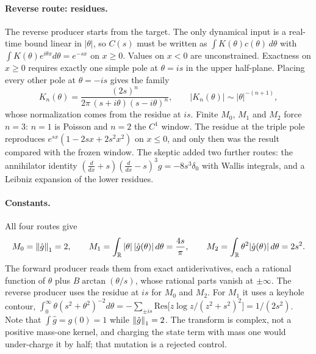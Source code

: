 \paragraph{Reverse route: residues.}
The reverse producer starts from the target. The only dynamical input is a
real-time bound linear in $|\theta|$, so $C(s)$ must be written as
$\int K(\theta)c(\theta)\,d\theta$ with $\int K(\theta)e^{i\theta x}d\theta=e^{-sx}$
on $x\ge0$. Values on $x<0$ are unconstrained. Exactness on $x\ge0$ requires
exactly one simple pole at $\theta=is$ in the upper half-plane. Placing every
other pole at $\theta=-is$ gives the family
\begin{equation}
 K_n(\theta)=\frac{(2s)^n}{2\pi\,(s+i\theta)(s-i\theta)^n},\qquad
 |K_n(\theta)|\sim|\theta|^{-(n+1)},
 \label{eq:av2-residue}
\end{equation}
whose normalization comes from the residue at $is$. Finite $M_0$, $M_1$ and
$M_2$ force $n=3$: $n=1$ is Poisson and $n=2$ the $C^1$ window. The residue at
the triple pole reproduces $e^{sx}(1-2sx+2s^2x^2)$ on $x\le0$, and only then
was the result compared with the frozen window. The skeptic added two further
routes: the annihilator identity
$(\tfrac{d}{dx}+s)(\tfrac{d}{dx}-s)^3g=-8s^3\delta_0$ with Wallis integrals,
and a Leibniz expansion of the lower residues.

\paragraph{Constants.}
All four routes give
\begin{equation}
 M_0=\left\lVert\hat g\right\rVert_1=2,\qquad
 M_1=\int_{\mathbb R}|\theta|\,|\hat g(\theta)|\,d\theta=\frac{4s}{\pi},\qquad
 M_2=\int_{\mathbb R}\theta^2|\hat g(\theta)|\,d\theta=2s^2 .
 \label{eq:av2-constants}
\end{equation}
The forward producer reads them from exact antiderivatives, each a rational
function of $\theta$ plus $B\arctan(\theta/s)$, whose rational parts vanish at
$\pm\infty$.
The reverse producer uses the residue at $is$ for $M_0$ and $M_2$. For $M_1$
it uses a keyhole contour,
$\int_0^\infty\theta(s^2+\theta^2)^{-2}d\theta
=-\sum_{\pm is}\mathrm{Res}\bigl[z\log z/(z^2+s^2)^2\bigr]=1/(2s^2)$. Note
that $\int\hat g=g(0)=1$ while $\left\lVert\hat g\right\rVert_1=2$. The transform is complex,
not a positive mass-one kernel, and charging the state term with mass one
would under-charge it by half; that mutation is a rejected control.

